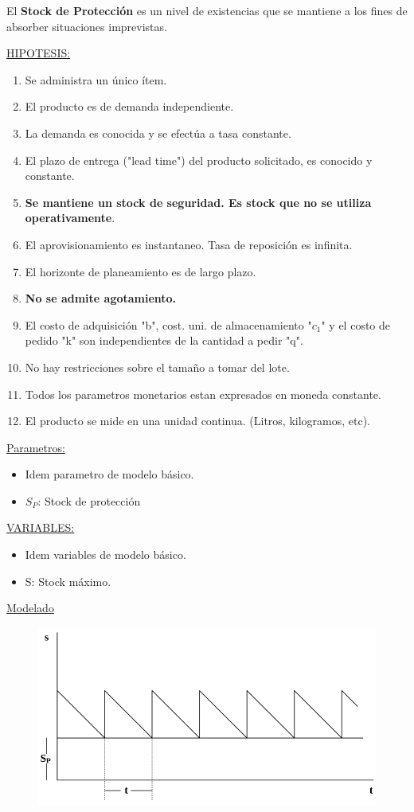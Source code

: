 \documentclass{article}
\begin{document}
El \textbf{Stock de Protección} es un nivel de existencias que se mantiene a los fines de absorber situaciones imprevistas.

\noindent
\underline{HIPOTESIS:}
\begin{enumerate}
    \item Se administra un único ítem.
    \item El producto es de demanda independiente.
    \item La demanda es conocida y se efectúa a tasa constante.
    \item El plazo de entrega ("lead time") del producto solicitado, es conocido y constante.
    \item \textbf{Se mantiene un stock de seguridad. Es stock que no se utiliza operativamente}.
    \item El aprovisionamiento es instantaneo. Tasa de reposición es infinita.
    \item El horizonte de planeamiento es de largo plazo.
    \item \textbf{No se admite agotamiento.}
    \item El costo de adquisición "b", cost. uni. de almacenamiento "\(c_1\)" y el costo de pedido "k" son independientes de la cantidad a pedir "q".
    \item No hay restricciones sobre el tamaño a tomar del lote.
    \item Todos los parametros monetarios estan expresados en moneda constante.
    \item El producto se mide en una unidad continua. (Litros, kilogramos, etc).
\end{enumerate}


\noindent
\underline{Parametros:}
\begin{itemize}
    \item Idem parametro de modelo básico.
    \item \(S_P\): Stock de protección
\end{itemize}


\noindent
\underline{VARIABLES:}
\begin{itemize}
    \item Idem variables de modelo básico.
    \item S: Stock máximo.
\end{itemize}


\underline{Modelado}


\begin{figure}[h!]
    \includegraphics[width=\linewidth]{imagenes/stock-proteccion.png}
\end{figure}
\end{document}
